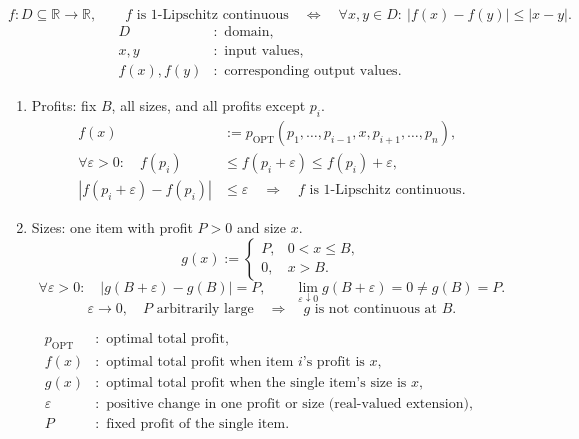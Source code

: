 \documentclass[12pt,a4paper]{article}
\begin{document}
\begin{definition}
\[
f:D\subseteq\mathbb R\to\mathbb R,\qquad
f\text{ is 1-Lipschitz continuous}
\quad\Longleftrightarrow\quad
\forall x,y\in D:\ |f(x)-f(y)|\leq|x-y|.
\]
\[
\begin{aligned}
D&:\text{ domain},\\
x,y&:\text{ input values},\\
f(x),f(y)&:\text{ corresponding output values}.
\end{aligned}
\]
\end{definition}

\begin{remark}
\begin{enumerate}
\item Profits: fix $B$, all sizes, and all profits except $p_i$.
\[
\begin{aligned}
f(x)&:=p_{\mathrm{OPT}}(p_1,\ldots,p_{i-1},x,p_{i+1},\ldots,p_n),\\[3pt]
\forall\varepsilon>0:\quad
f(p_i)&\leq f(p_i+\varepsilon)\leq f(p_i)+\varepsilon,\\[3pt]
|f(p_i+\varepsilon)-f(p_i)|&\leq\varepsilon
\quad\Longrightarrow\quad f\text{ is 1-Lipschitz continuous}.
\end{aligned}
\]
\item Sizes: one item with profit $P>0$ and size $x$.
\[
g(x):=\begin{cases}
P,&0<x\leq B,\\
0,&x>B.
\end{cases}
\]
\[
\forall\varepsilon>0:\quad
|g(B+\varepsilon)-g(B)|=P,
\qquad\lim_{\varepsilon\downarrow0}g(B+\varepsilon)=0\neq g(B)=P.
\]
\[
\varepsilon\to0,\quad P\text{ arbitrarily large}
\quad\Longrightarrow\quad g\text{ is not continuous at }B.
\]
\end{enumerate}
\[
\begin{aligned}
p_{\mathrm{OPT}}&:\text{ optimal total profit},\\
f(x)&:\text{ optimal total profit when item }i\text{'s profit is }x,\\
g(x)&:\text{ optimal total profit when the single item's size is }x,\\
\varepsilon&:\text{ positive change in one profit or size (real-valued extension)},\\
P&:\text{ fixed profit of the single item}.
\end{aligned}
\]
\end{remark}
\end{document}

